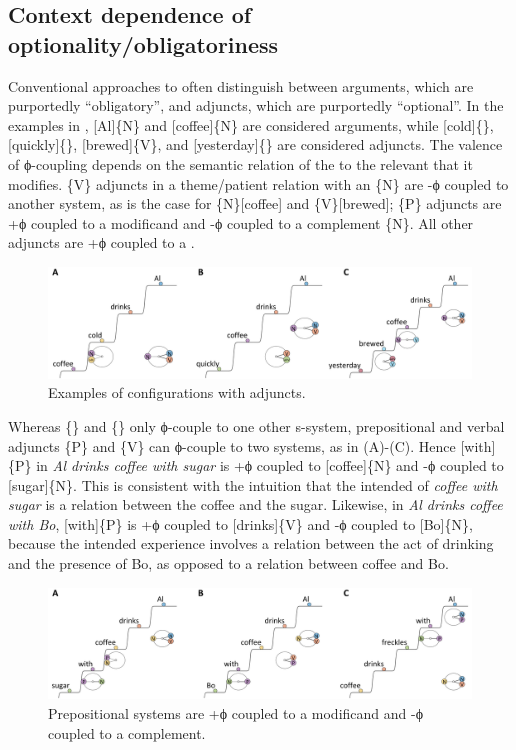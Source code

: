 \subsection{Context dependence of optionality/obligatoriness}

Conventional approaches to  often distinguish between arguments, which are purportedly “obligatory”, and adjuncts, which are purportedly “optional”. In the examples in {}, [Al]\{N\} and [coffee]\{N\} are considered arguments, while [cold]\{\}, [quickly]\{\}, [brewed]\{V\}, and [yesterday]\{\} are considered adjuncts. The valence of  ϕ-coupling depends on the semantic relation of the  to the relevant  that it modifies. \{V\} adjuncts in a theme/patient relation with an \{N\} are -ϕ coupled to another system, as is the case for \{N\}[coffee] and \{V\}[brewed]; \{P\} adjuncts are +ϕ coupled to a modificand and -ϕ coupled to a complement \{N\}. All other adjuncts are +ϕ coupled to a .

  
\begin{figure}
\includegraphics[width=\textwidth]{figures/Tilsen-img83.png}
\caption{Examples of configurations with adjuncts.}
\label{fig:4:33}
\end{figure}
 

  Whereas \{\} and \{\} only ϕ-couple to one other s-system, prepositional and verbal adjuncts \{P\} and \{V\} can ϕ-couple to two systems, as in {}(A)-(C). Hence [with]\{P\} in \textit{Al drinks coffee with sugar} is +ϕ coupled to [coffee]\{N\} and -ϕ coupled to [sugar]\{N\}. This is consistent with the intuition that the intended  of \textit{coffee with sugar} is a relation between the coffee and the sugar. Likewise, in \textit{Al drinks coffee with Bo}, [with]\{P\} is +ϕ coupled to [drinks]\{V\} and -ϕ coupled to [Bo]\{N\}, because the intended experience involves a relation between the act of drinking and the presence of Bo, as opposed to a relation between coffee and Bo.

  
\begin{figure}
\includegraphics[width=\textwidth]{figures/Tilsen-img84.png}
\caption{Prepositional systems are +ϕ coupled to a modificand and -ϕ coupled to a complement.}
\label{fig:4:34}
\end{figure}
 

